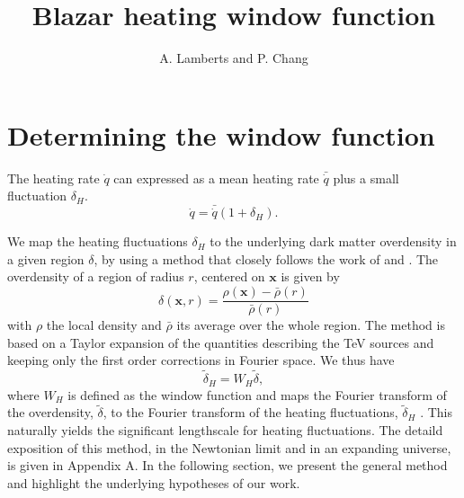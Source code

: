 \documentclass[onecolumn]{emulateapj}
\begin{document}
\title{Blazar heating window function}

\author{A. Lamberts and P. Chang}
\affil{}







\section {Determining the window function}\label{window}
The heating rate $\dot{q}$ can expressed as a mean heating rate $\bar{\dot{q}}$ plus a small fluctuation $\delta_H$.
\begin{equation}
  \label{eq:delta_h}
  \dot{q}=\bar{\dot{q}}(1+\delta_H).
\end{equation}

We map the heating fluctuations $\delta_H$ to the underlying dark matter overdensity in a given region $\delta$, by using a method that closely follows the work of  \citet{2007MNRAS.376.1680P} and \citet{2005ApJ...626....1B}. The overdensity of a region of radius $r$, centered on $\mathbf{x}$ is given by
\begin{equation}
  \label{eq:delta}
  \delta(\mathbf{x},r)=\frac{\rho(\mathbf{x})-\bar{\rho}(r)}{\bar{\rho}(r)}
\end{equation}
with $\rho$ the local density and $\bar{\rho}$ its average over the whole region. The method is based on a Taylor expansion of the quantities describing the TeV sources and keeping only the first order corrections in Fourier space.  We thus have
\begin{equation}
  \label{eq:use_window}
  \tilde{\delta}_H=W_H\tilde{\delta},
\end{equation}
where $W_H$ is defined as the window function and maps the Fourier transform of the overdensity, $\tilde{\delta}$, to the Fourier transform of the heating fluctuations, $\tilde{\delta}_H$ . This naturally yields the significant lengthscale for heating fluctuations. 
The detaild exposition of this method, in the Newtonian limit and in an expanding universe, is given in Appendix A. In the following section, we present the general method and highlight the underlying hypotheses of our work.
\end{document}
